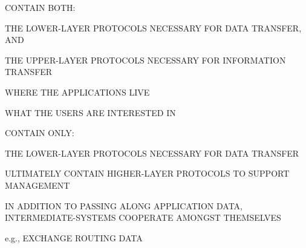 

\begin{bwslide}

\begin{nrtc}
\item	CONTAIN BOTH: 
    \begin{nrtc}
    \item	THE LOWER-LAYER PROTOCOLS NECESSARY FOR DATA TRANSFER, AND

    \item	THE UPPER-LAYER PROTOCOLS NECESSARY FOR INFORMATION TRANSFER
    \end{nrtc}

\item	WHERE THE APPLICATIONS LIVE

\item	WHAT THE USERS ARE INTERESTED IN
\end{nrtc}
\end{bwslide}


\begin{bwslide}

\begin{nrtc}
\item	CONTAIN ONLY:
    \begin{nrtc}
    \item	THE LOWER-LAYER PROTOCOLS NECESSARY FOR DATA TRANSFER
    \end{nrtc}

\item	ULTIMATELY CONTAIN HIGHER-LAYER PROTOCOLS TO SUPPORT MANAGEMENT

\item	IN ADDITION TO PASSING ALONG APPLICATION DATA,
	INTERMEDIATE-SYSTEMS COOPERATE AMONGST THEMSELVES
    \begin{nrtc}
    \item	e.g., EXCHANGE ROUTING DATA
    \end{nrtc}
\end{nrtc}
\end{bwslide}


